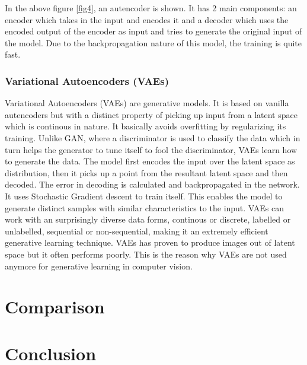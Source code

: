 \documentclass[conference]{IEEEtran}
\begin{document}
In the above figure \ref{fig4}, an autencoder is shown. It has 2 main components: an encoder which takes in the input and encodes it and a decoder which uses the encoded output of the encoder as input and tries to generate the original input of the model. Due to the backpropagation nature of this model, the training is quite fast.

\subsubsection{Variational Autoencoders (VAEs)}
Variational Autoencoders (VAEs) are generative models. It is based on vanilla autencoders but with a distinct property of picking up input from a latent space which is continous in nature. It basically avoids overfitting by regularizing its training. Unlike GAN, where a discriminator is used to classify the data which in turn helps the generator to tune itself to fool the discriminator, VAEs learn how to generate the data. The model first encodes the input over the latent space as distribution, then it picks up a point from the resultant latent space and then decoded. The error in decoding is calculated and backpropagated in the network. It uses Stochastic Gradient descent to train itself. This enables the model to generate distinct samples with similar characteristics to the input. VAEs can work with an surprisingly diverse data forms, continous or discrete, labelled or unlabelled, sequential or non-sequential, making it an extremely efficient generative learning technique. VAEs has proven to produce images out of latent space but it often performs poorly. This is the reason why VAEs are not used anymore for generative learning in computer vision.

\section{Comparison}
\label{comparison}

\section{Conclusion}
\label{conclusion}
\end{document}

